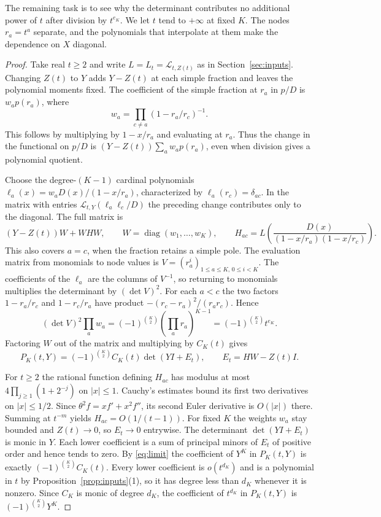 \documentclass[11pt,letterpaper]{article}
\numberwithin{equation}{section}
\begin{document}
The remaining task is to see why the determinant contributes no
additional power of \(t\) after division by \(t^{e_K}\).
We let \(t\) tend to \(+\infty\) at fixed \(K\). The nodes \(r_a=t^a\)
separate, and the polynomials that interpolate at them make the
dependence on \(X\) diagonal.

\begin{proof}
Take real \(t\ge2\) and write \(L=L_t=\mathcal L_{t,Z(t)}\) as in
Section~\ref{sec:inputs}. Changing \(Z(t)\) to \(Y\) adds \(Y-Z(t)\) at each simple fraction
and leaves the polynomial moments fixed. The coefficient of the simple
fraction at \(r_a\) in \(p/D\) is \(w_a p(r_a)\), where
\[
           w_a=\prod_{c\ne a}(1-r_a/r_c)^{-1}.
\]
This follows by multiplying by \(1-x/r_a\) and evaluating at \(r_a\).
Thus the change in the functional on \(p/D\) is
\((Y-Z(t))\sum_a w_a p(r_a)\), even when division gives a polynomial
quotient.

Choose the degree-\((K-1)\) cardinal polynomials
\(\ell_a(x)=w_aD(x)/(1-x/r_a)\), characterized by
\(\ell_a(r_c)=\delta_{ac}\). In the matrix with entries
\(\mathcal L_{t,Y}(\ell_a\ell_c/D)\) the preceding change contributes
only to the diagonal. The full matrix is
\[
   (Y-Z(t))W+WHW,\qquad
   W=\operatorname{diag}(w_1,\ldots,w_K),\qquad
   H_{ac}=L\!\left(\frac{D(x)}{(1-x/r_a)(1-x/r_c)}\right).
\]
This also covers \(a=c\), when the fraction retains a simple pole.
The evaluation matrix from monomials to node values is
\(V=(r_a^i)_{1\le a\le K,\,0\le i<K}\). The coefficients of
the \(\ell_a\) are the columns of \(V^{-1}\), so returning to
monomials multiplies the determinant by \((\det V)^2\).
For each \(a<c\) the two factors \(1-r_a/r_c\) and \(1-r_c/r_a\)
have product \(-(r_c-r_a)^2/(r_a r_c)\). Hence
\[
   (\det V)^2\prod_a w_a=(-1)^{\binom K2}
        \left(\prod_a r_a\right)^{K-1}=(-1)^{\binom K2}t^{e_K}.
\]
Factoring \(W\) out of the matrix and multiplying by \(C_K(t)\) gives
\begin{equation}\label{eq:limit}
 P_K(t,Y)=(-1)^{\binom K2}C_K(t)\det(YI+E_t),
 \qquad E_t=HW-Z(t)I .
\end{equation}

For \(t\ge2\) the rational function defining \(H_{ac}\) has modulus
at most \(4\prod_{j\ge1}(1+2^{-j})\) on \(|x|\le1\).
Cauchy's estimates bound its first two derivatives on \(|x|\le1/2\).
Since \(\theta^2 f=xf'+x^2 f''\), its second Euler derivative is
\(O(|x|)\) there. Summing at \(t^{-m}\) yields \(H_{ac}=O(1/(t-1))\).
For fixed \(K\) the weights \(w_a\) stay bounded and \(Z(t)\to0\), so
\(E_t\to0\) entrywise. The determinant \(\det(YI+E_t)\) is monic
in \(Y\). Each lower coefficient is a sum of principal minors of
\(E_t\) of positive order and hence tends to zero.
By \eqref{eq:limit} the coefficient of \(Y^K\) in \(P_K(t,Y)\)
is exactly \((-1)^{\binom K2}C_K(t)\). Every lower coefficient is
\(o(t^{d_K})\) and is a polynomial in \(t\) by
Proposition~\ref{prop:inputs}(1), so it has degree less than \(d_K\)
whenever it is nonzero. Since \(C_K\) is monic of degree \(d_K\), the
coefficient of \(t^{d_K}\) in \(P_K(t,Y)\) is \((-1)^{\binom K2}Y^K\).
\end{proof}
\end{document}
